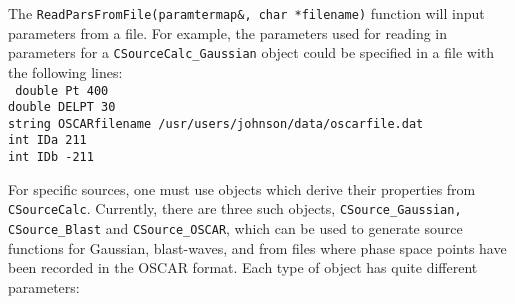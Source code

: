 \documentclass[10pt]{article}
\begin{document}
The {\tt ReadParsFromFile(paramtermap\&, char *filename)} function will input parameters from a file. For example, the parameters used for reading in parameters for a {\tt CSourceCalc\_Gaussian} object could be specified in a file with the following lines:\\
{\tt
double Pt 400\\
double DELPT 30\\
string OSCARfilename /usr/users/johnson/data/oscarfile.dat\\
int IDa 211\\
int IDb -211}

For specific sources, one must use objects which derive their properties from {\tt CSourceCalc}. Currently, there are three such objects, {\tt CSource\_Gaussian, CSource\_Blast} and {\tt CSource\_OSCAR}, which can be used to generate source functions for Gaussian, blast-waves, and from files where phase space points have been recorded in the OSCAR format. Each type of object has quite different parameters:
\newpage
\end{document}
